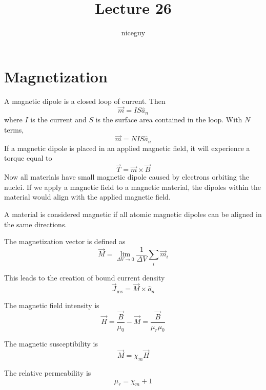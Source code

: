 \documentclass[12pt]{article}
\author{niceguy}
\title{Lecture 26}
\begin{document}
\maketitle

\section{Magnetization}

A magnetic dipole is a closed loop of current. Then
$$\vec m = IS\hat{a}_n$$
where $I$ is the current and $S$ is the surface area contained in the loop.
With $N$ terms,
$$\vec m = NIS\hat{a}_n$$
If a magnetic dipole is placed in an applied magnetic field, it will experience a torque equal to
$$\vec{T} = \vec{m} \times \vec{B}$$
Now all materials have small magnetic dipole caused by electrons orbiting the nuclei. If we apply a magnetic field to a magnetic material, the dipoles within the material would align with the applied magnetic field.

\begin{defn}
	A material is considered magnetic if all atomic magnetic dipoles can be aligned in the same directions.
\end{defn}

\begin{defn}
	The magnetization vector is defined as
	$$\vec{M} = \lim_{\Delta V \rightarrow 0} \frac{1}{\Delta V} \sum_i \vec{m}_i$$
\end{defn}

\begin{defn}
	This leads to the creation of bound current density
	$$\vec J_{\text{ms}} = \vec M \times \hat a_n$$
\end{defn}

\begin{defn}
	The magnetic field intensity is
	$$\vec H = \frac{\vec B}{\mu_0} - \vec M = \frac{\vec B}{\mu_r\mu_0}$$
\end{defn}

\begin{defn}
	The magnetic susceptibility is
	$$\vec M = \chi_m \vec H$$
\end{defn}

\begin{defn}
	The relative permeability is
	$$\mu_r = \chi_m + 1$$
\end{defn}
\end{document}
